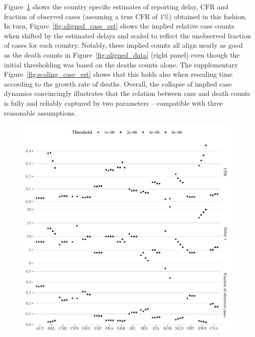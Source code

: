 \documentclass[fullpage,a4paper]{article}
\newcommand{\fig}[1]{Figure~\ref{fig:#1}}
\begin{document}
\fig{estimates} shows the country specific estimates of reporting
delay, CFR and fraction of observed cases (assuming a true CFR of
$1\%$) obtained in this fashion. In turn, \fig{aligned_case_est} shows
the implied relative case counts when shifted by the estimated delays
and scaled to reflect the unobserved fraction of cases for each
country. Notably, these implied counts all align nearly as good as the
death counts in \fig{aligned_data} (right panel) even though the
initial thresholding was based on the deaths counts alone. The
supplementary \fig{scaling_case_est} shows that this holds also when
rescaling time according to the growth rate of deaths. Overall, the
collapse of implied case dynamics convincingly illustrates that the
relation between case and death counts is fully and reliably captured
by two parameters -- compatible with three reasonable assumptions.
\begin{figure}
  \includegraphics[width=1\textwidth]{../figs/ecdc_estimates.pdf}
  \caption{\label{fig:estimates}}
\end{figure}
\end{document}
